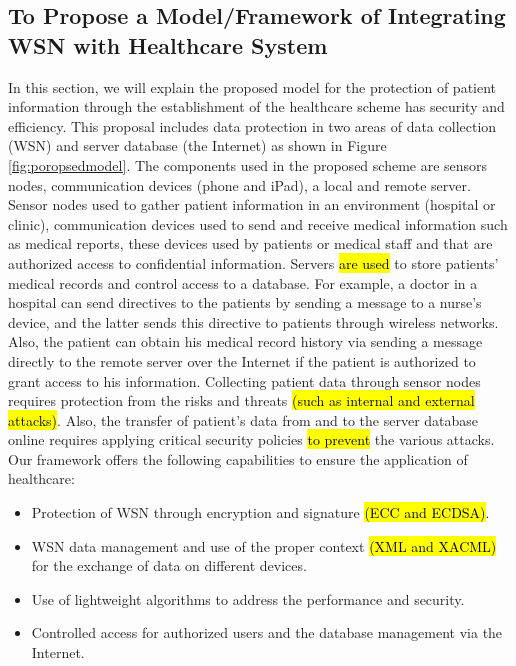 \documentclass[a4paper,11pt]{article}
\DeclareRobustCommand{\hlyellow}[1]{{\sethlcolor{white}\hl{#1}}}
\begin{document}
\subsection{To Propose a Model/Framework of Integrating WSN with Healthcare System}
In this section, we will explain the proposed model for the protection of patient information through the establishment of the healthcare scheme has security and efficiency. This proposal includes data protection in two areas of data collection (WSN) and server database (the Internet) as shown in Figure \ref{fig:poropsedmodel}. The components used in the proposed scheme are sensors nodes, communication devices (phone and iPad), a local and remote server. Sensor nodes used to gather patient information in an environment (hospital or clinic), communication devices used to send and receive medical information such as medical reports, these devices used by patients or medical staff and that are authorized access to confidential information. Servers \hlyellow{are used} to store patients' medical records and control access to a database. For example, a doctor in a hospital can send directives to the patients by sending a message to a nurse's device, and the latter sends this directive to patients through wireless networks. Also, the patient can obtain his medical record history via sending a message directly to the remote server over the Internet if the patient is authorized to grant access to his information. Collecting patient data through sensor nodes requires protection from the risks and threats \hlyellow{(such as internal and external attacks)}. Also, the transfer of patient's data from and to the server database online requires applying critical security policies \hlyellow{to prevent} the various attacks. Our framework offers the following capabilities to ensure the application of healthcare:
\begin{itemize}
\item Protection of WSN through encryption and signature \hlyellow{(ECC and ECDSA)}.
\item WSN data management and use of the proper context \hlyellow{(XML and XACML)} for the exchange of data on different devices.
\item Use of lightweight algorithms to address the performance and security.
\item Controlled access for authorized users and the database management via the Internet.
\end{itemize}
\end{document}
